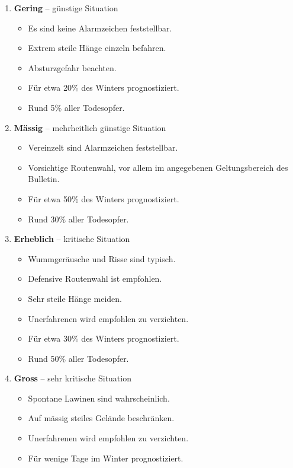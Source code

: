 \begin{enumerate}
  \item{
    \textbf{Gering} -- günstige Situation
    \begin{itemize}
      \item{Es sind keine Alarmzeichen feststellbar.}
      \item{Extrem steile Hänge einzeln befahren.}
      \item{Absturzgefahr beachten.}
      \item{Für etwa 20\% des Winters prognostiziert.}
      \item{Rund 5\% aller Todesopfer.}
    \end{itemize}
  }
  \item{
    \textbf{Mässig} -- mehrheitlich günstige Situation
    \begin{itemize}
      \item{Vereinzelt sind Alarmzeichen feststellbar.}
      \item{Vorsichtige Routenwahl, vor allem im angegebenen Geltungsbereich des Bulletin.}
      \item{Für etwa 50\% des Winters prognostiziert.}
      \item{Rund 30\% aller Todesopfer.}
    \end{itemize}
  }
  \item{
    \textbf{Erheblich} -- kritische Situation
    \begin{itemize}
      \item{Wummgeräusche und Risse sind typisch.}
      \item{Defensive Routenwahl ist empfohlen.}
      \item{Sehr steile Hänge meiden.}
      \item{Unerfahrenen wird empfohlen zu verzichten.}
      \item{Für etwa 30\% des Winters prognostiziert.}
      \item{Rund 50\% aller Todesopfer.}
    \end{itemize}
  }
  \item{
    \textbf{Gross} -- sehr kritische Situation
    \begin{itemize}
      \item{Spontane Lawinen sind wahrscheinlich.}
      \item{Auf mässig steiles Gelände beschränken.}
      \item{Unerfahrenen wird empfohlen zu verzichten.}
      \item{Für wenige Tage im Winter prognostiziert.}

\end{itemize}}
\end{enumerate}
